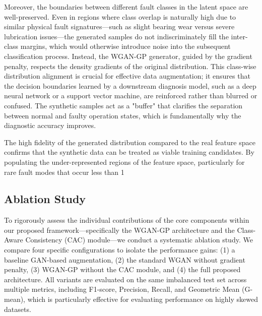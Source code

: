 \documentclass[conference,twocolumn]{IEEEtran}
\begin{document}
Moreover, the boundaries between different fault classes in the latent space are well-preserved. Even in regions where class overlap is naturally high due to similar physical fault signatures—such as slight bearing wear versus severe lubrication issues—the generated samples do not indiscriminately fill the inter-class margins, which would otherwise introduce noise into the subsequent classification process. Instead, the WGAN-GP generator, guided by the gradient penalty, respects the density gradients of the original distribution. This class-wise distribution alignment is crucial for effective data augmentation; it ensures that the decision boundaries learned by a downstream diagnosis model, such as a deep neural network or a support vector machine, are reinforced rather than blurred or confused. The synthetic samples act as a "buffer" that clarifies the separation between normal and faulty operation states, which is fundamentally why the diagnostic accuracy improves.

The high fidelity of the generated distribution compared to the real feature space confirms that the synthetic data can be treated as viable training candidates. By populating the under-represented regions of the feature space, particularly for rare fault modes that occur less than 1%

\subsection{Ablation Study}
\label{subsec:ablation}

To rigorously assess the individual contributions of the core components within our proposed framework—specifically the WGAN-GP architecture and the Class-Aware Consistency (CAC) module—we conduct a systematic ablation study. We compare four specific configurations to isolate the performance gains: (1) a baseline GAN-based augmentation, (2) the standard WGAN without gradient penalty, (3) WGAN-GP without the CAC module, and (4) the full proposed architecture. All variants are evaluated on the same imbalanced test set across multiple metrics, including F1-score, Precision, Recall, and Geometric Mean (G-mean), which is particularly effective for evaluating performance on highly skewed datasets.
\end{document}

